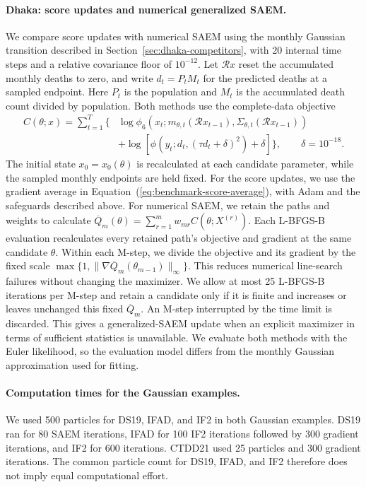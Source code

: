 \documentclass[11pt]{article}
\theoremstyle{thmstylethree}%
\begin{document}
\paragraph{Dhaka: score updates and numerical generalized SAEM.}
We compare score updates with numerical SAEM using the monthly Gaussian transition described in
Section~\ref{sec:dhaka-competitors}, with 20 internal time steps and
a relative covariance floor of $10^{-12}$.
Let $\mathcal R x$ reset the accumulated monthly deaths to zero, and
write $d_t=P_tM_t$ for the predicted deaths at a sampled endpoint.
Here $P_t$ is the population and $M_t$ is the accumulated death count
divided by population. Both methods use the complete-data objective
\begin{align}
 C(\theta;x)=\sum_{t=1}^T\big\{&
   \log\phi_6\!\left(x_t;m_{\theta,t}(\mathcal R x_{t-1}),
                     \Sigma_{\theta,t}(\mathcal R x_{t-1})\right)
   \nonumber\\[-2pt]
   &+\log[\phi(y_t;d_t,(\tau d_t+\delta)^2)+\delta]\big\},
 \qquad \delta=10^{-18}.
 \label{eq:benchmark-dhaka-objective}
\end{align}
The initial state $x_0=x_0(\theta)$ is recalculated at each candidate
parameter, while the sampled monthly endpoints are held fixed.
For the score updates, we use the gradient average in
Equation~(\ref{eq:benchmark-score-average}), with Adam and the safeguards
described above.
For numerical SAEM, we retain the paths and weights to calculate
$\overline Q_m(\theta)=\sum_{r=1}^m w_{mr}C(\theta;X^{(r)})$.
Each L-BFGS-B evaluation recalculates every retained path's objective
and gradient at the same candidate $\theta$.
Within each M-step, we divide the objective and its gradient by the fixed
scale $\max\{1,\|\nabla\overline Q_m(\theta_{m-1})\|_\infty\}$.
This reduces numerical line-search failures without changing the maximizer.
We allow at most 25 L-BFGS-B iterations per M-step and retain a candidate
only if it is finite and increases or leaves unchanged this fixed
$\overline Q_m$. An M-step interrupted by the time limit is discarded.
This gives a generalized-SAEM update when an explicit maximizer in terms
of sufficient statistics is unavailable.
We evaluate both methods with the Euler likelihood, so the evaluation
model differs from the monthly Gaussian approximation used for fitting.

\paragraph{Computation times for the Gaussian examples.}
We used 500 particles for DS19, IFAD, and IF2 in both Gaussian examples.
DS19 ran for 80 SAEM iterations, IFAD for 100 IF2 iterations followed by
300 gradient iterations, and IF2 for 600 iterations.
CTDD21 used 25 particles and 300 gradient iterations.
The common particle count for DS19, IFAD, and IF2 therefore does not
imply equal computational effort.
\end{document}
